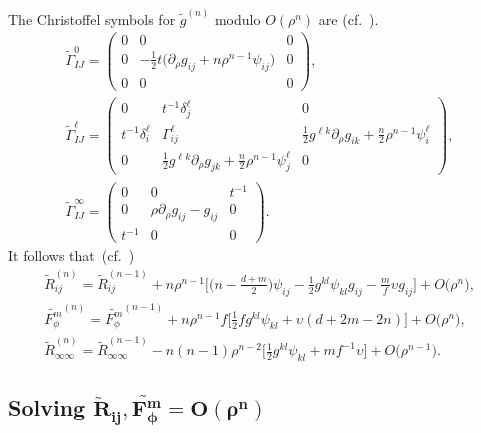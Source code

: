 \documentclass[pdftex]{sigma}
\numberwithin{equation}{section}
\begin{document}
The Christoffel symbols for $\widetilde{g}^{(n)}$ modulo $O(\rho^n)$ are (cf.~\cite[equation~(3.16)]{FeffermanGraham2012}).
\begin{gather*}
\widetilde{\Gamma}_{I J }^0=\begin{pmatrix}
0 & 0 & 0 \\
0 & -\frac{1}{2} t\big(\partial_{\rho} g_{i j}+n \rho^{n-1} \psi_{i j}\big) & 0 \\
0 & 0 & 0
\end{pmatrix}\!,
\\
\widetilde{\Gamma}_{I J}^\ell=\begin{pmatrix}
0 & t^{-1} \delta_{j}^{\ell} & 0 \\
t^{-1} \delta_{i}^{\ell} & \Gamma_{i j}^\ell & \frac{1}{2} g^{\ell k} \partial_{\rho} g_{i k}+\frac{n}{2} \rho^{n-1} \psi_{i}^{\ell}\\
0 & \frac{1}{2} g^{\ell k} \partial_{\rho} g_{j k}+\frac{n}{2} \rho^{n-1} \psi_{j}^{\ell} & 0
\end{pmatrix}\!,
\\
\widetilde{\Gamma}_{I J}^\infty=\begin{pmatrix}
0 & 0 & t^{-1} \\
0 & \rho \partial_{\rho} g_{i j}-g_{i j} & 0 \\
t^{-1} & 0 & 0
\end{pmatrix}\!.
\end{gather*}
It follows that~(cf.~\cite[equation~(3.11)]{FeffermanGraham2012})
\begin{subequations}
\begin{gather}
\label{ricij}
\widetilde{R}_{ij}^{(n)}=\widetilde{R}_{ij}^{(n-1)}+n\rho^{n-1} \bigg[\bigg(n-\frac{d+m}{2}\bigg)\psi_{ij}-\frac{1}{2}g^{kl}\psi_{kl}g_{ij}-\frac{m}{f}\upsilon g_{ij}\bigg]+O\big(\rho^{n}\big),
\\
\label{rphi}
\widetilde{F_{\phi}^m}^{(n)}= \widetilde{F_{\phi}^m}^{(n-1)}
+ n\rho^{n-1}f \bigg[\frac{1}{2}fg^{kl}\psi_{kl}+\upsilon (d+2m-2n) \bigg]+O\big(\rho^{n}\big),
\\
\widetilde{R}_{\infty\infty}^{(n)}=\widetilde{R}_{\infty\infty}^{(n-1)}-n(n-1)\rho^{n-2} \bigg[\frac{1}{2}g^{kl}\psi_{kl}+mf^{-1}\upsilon\bigg]+O\big(\rho^{n-1}\big)\label{ricinftyinfty}.
\end{gather}
\end{subequations}

\subsection[Solving widetilde {R}\_\{ij\}, widetilde {F\_\{phi\}\textasciicircum{}m}=O(rho\textasciicircum{}n)]{Solving $\boldsymbol{\widetilde{R}_{ij},\widetilde{F_\phi^m}=O(\rho^n)}$}
\label{section-4.1}
\end{document}
